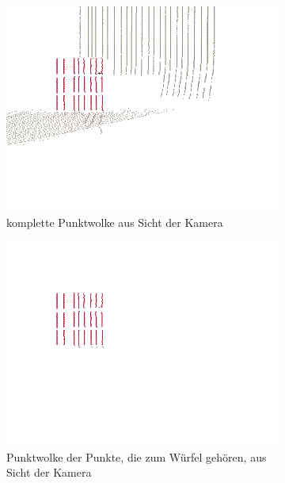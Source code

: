 \documentclass[ngerman,a4paper,parskip=half]{scrartcl}
\begin{document}
\begin{figure}[H]
	\centering
	\begin{subfigure}{0.45\textwidth}
		\includegraphics[width=\textwidth,frame,trim=0 120 0 20,clip]{includes/free_red_cam.png}
		\caption{komplette Punktwolke aus Sicht der Kamera}
	\end{subfigure}
	\hfill
	\begin{subfigure}{0.45\textwidth}
		\includegraphics[width=\textwidth,frame,trim=0 120 0 20,clip]{includes/free_only_red_cam.png}
		\caption{Punktwolke der Punkte, die zum Würfel gehören, aus Sicht der Kamera}
	\end{subfigure}
	\begin{subfigure}{0.45\textwidth}

\end{subfigure}
\end{figure}
\end{document}
